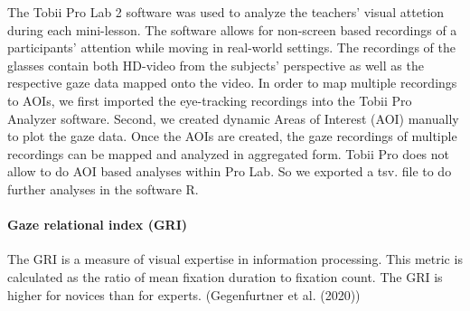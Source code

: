 \documentclass[
  english,
  man,floatsintext]{apa6}
\let\oldparagraph\paragraph
\renewcommand{\paragraph}[1]{\oldparagraph{#1}\mbox{}}
\begin{document}
The Tobii Pro Lab 2 software was used to analyze the teachers' visual attetion during each mini-lesson. The software allows for non-screen based recordings of a participants' attention while moving in real-world settings. The recordings of the glasses contain both HD-video from the subjects' perspective as well as the respective gaze data mapped onto the video. In order to map multiple recordings to AOIs, we first imported the eye-tracking recordings into the Tobii Pro Analyzer software. Second, we created dynamic Areas of Interest (AOI) manually to plot the gaze data. Once the AOIs are created, the gaze recordings of multiple recordings can be mapped and analyzed in aggregated form. Tobii Pro does not allow to do AOI based analyses within Pro Lab. So we exported a tsv. file to do further analyses in the software R.

\hypertarget{gaze-relational-index-gri}{%
\paragraph{Gaze relational index (GRI)}\label{gaze-relational-index-gri}}

The GRI is a measure of visual expertise in information processing. This metric is calculated as the ratio of mean fixation duration to fixation count. The GRI is higher for novices than for experts. (Gegenfurtner et al. (2020))
\end{document}
